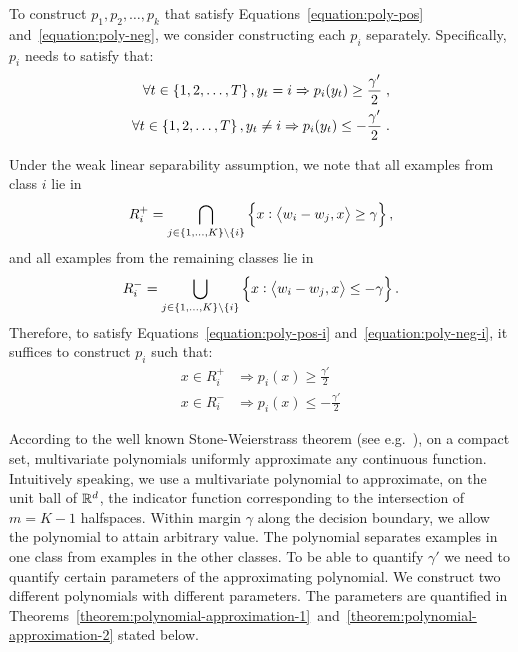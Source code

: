 To construct $p_1, p_2, \dots, p_k$ that satisfy
Equations~\eqref{equation:poly-pos} and~\eqref{equation:poly-neg}, we consider
constructing each $p_i$ separately. Specifically, $p_i$ needs to satisfy that:
\begin{align}
\label{equation:poly-pos-i}
\forall t \in \cbr{1,2,\dots,T}, y_t = i \Rightarrow p_i(y_t) \ge \frac{\gamma'}2 \; , \\
\label{equation:poly-neg-i}
\forall t \in \cbr{1,2,\dots,T}, y_t \neq i \Rightarrow p_i(y_t) \le -\frac{\gamma'}2 \; .
\end{align}

Under the weak linear separability assumption, we note that all examples from
class $i$ lie in
\[ R_i^+ = \bigcap_{j \in \cbr{1,\ldots,K} \setminus \cbr{i}} \cbr{x: \ip{w_i - w_j}{x} \geq \gamma}, \] and all examples from the remaining classes lie in
\[ R_i^- = \bigcup_{j \in \cbr{1,\ldots,K} \setminus \cbr{i}} \cbr{x: \ip{w_i - w_j}{x} \leq  -\gamma}. \]
Therefore, to satisfy Equations~\eqref{equation:poly-pos-i}
and~\eqref{equation:poly-neg-i}, it suffices to construct $p_i$ such that:
\begin{align*}
x \in R_i^+ & \Rightarrow p_i(x) \ge \frac {\gamma'} 2 \\
x \in R_i^- & \Rightarrow p_i(x) \le - \frac {\gamma'} 2
\end{align*}

According to the well known Stone-Weierstrass theorem (see
e.g.~\citet[Section~10.10]{Davidson-Donsig-2010}), on a compact set,
multivariate polynomials uniformly approximate any continuous function.
Intuitively speaking, we use a multivariate polynomial to approximate, on the
unit ball of $\mathbb{R}^d$, the indicator function corresponding to the intersection of
$m=K-1$ halfspaces. Within margin $\gamma$ along the decision boundary, we allow
the polynomial to attain arbitrary value. The polynomial separates examples in
one class from examples in the other classes. To be able to quantify $\gamma'$
we need to quantify certain parameters of the approximating polynomial. We
construct two different polynomials with different parameters. The parameters
are quantified in
Theorems~\ref{theorem:polynomial-approximation-1}~and~\ref{theorem:polynomial-approximation-2}
stated below.


